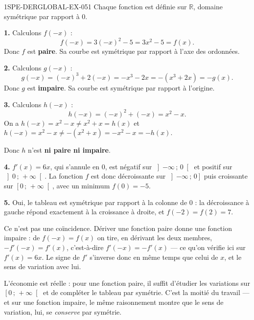 \begin{corrige}{1SPE-DERGLOBAL-EX-051}
Chaque fonction est définie sur $\mathbb{R}$, domaine symétrique par rapport à $0$.

\textbf{1.} Calculons $f(-x)$ :
\[
f(-x) = 3(-x)^2 - 5 = 3x^2 - 5 = f(x).
\]
Donc $f$ est \textbf{paire}. Sa courbe est symétrique par rapport à l'axe des ordonnées.

\textbf{2.} Calculons $g(-x)$ :
\[
g(-x) = (-x)^3 + 2(-x) = -x^3 - 2x = -(x^3 + 2x) = -g(x).
\]
Donc $g$ est \textbf{impaire}. Sa courbe est symétrique par rapport à l'origine.

\textbf{3.} Calculons $h(-x)$ :
\[
h(-x) = (-x)^2 + (-x) = x^2 - x.
\]
On a $h(-x) = x^2 - x
\neq x^2 + x = h(x)$ et $h(-x) = x^2 - x
\neq -(x^2 + x) = -x^2 - x = -h(x)$.

Donc $h$ n'est \textbf{ni paire ni impaire}.

\textbf{4.} $f'(x) = 6x$, qui s'annule en $0$, est négatif sur
$\left]-\infty\,;\,0\right[$ et positif sur $\left]0\,;\,+\infty\right[$. La
fonction $f$ est donc décroissante sur $\left]-\infty\,;\,0\right]$ puis
croissante sur $\left[0\,;\,+\infty\right[$, avec un minimum $f(0) = -5$.

\textbf{5.} Oui, le tableau est symétrique par rapport à la colonne de $0$ : la
décroissance à gauche répond exactement à la croissance à droite, et
$f(-2) = f(2) = 7$.

Ce n'est pas une coïncidence. Dériver une fonction paire donne une fonction
impaire : de $f(-x) = f(x)$ on tire, en dérivant les deux membres,
$-f'(-x) = f'(x)$, c'est-à-dire $f'(-x) = -f'(x)$ — ce qu'on vérifie ici sur
$f'(x) = 6x$. Le signe de $f'$ s'inverse donc en même temps que celui de $x$,
et le sens de variation avec lui.

L'économie est réelle : pour une fonction paire, il suffit d'étudier les
variations sur $\left[0\,;\,+\infty\right[$ et de compléter le tableau par
symétrie. C'est la moitié du travail — et sur une fonction impaire, le même
raisonnement montre que le sens de variation, lui, se \emph{conserve} par
symétrie.
\end{corrige}
